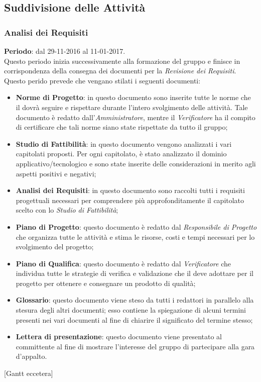 \subsection{Suddivisione delle Attività}
	\subsubsection{Analisi dei Requisiti}
	\textbf{Periodo}: dal 29-11-2016 al 11-01-2017.
	\\ Questo periodo inizia successivamente alla formazione del gruppo e finisce in corrispondenza della consegna dei documenti per la \emph{Revisione dei Requisiti}.
	Questo perido prevede che vengano stilati i seguenti documenti:
	\begin{itemize}
		\item \textbf{Norme di Progetto}: in questo documento sono inserite tutte le norme che il  dovrà seguire e rispettare durante l'intero svolgimento delle attività. Tale documento è redatto dall'\emph{Amministratore}, mentre il \emph{Verificatore} ha il compito di certificare che tali norme siano state rispettate da tutto il gruppo;
		\item \textbf{Studio di Fattibilità}: in questo documento vengono analizzati i vari capitolati proposti. Per ogni capitolato, è stato analizzato il dominio applicativo/tecnologico e sono state inserite delle considerazioni in merito agli aspetti positivi e negativi;
		\item \textbf{Analisi dei Requisiti}: in questo documento sono raccolti tutti i requisiti progettuali necessari per comprendere più approfonditamente	il capitolato scelto con lo \emph{Studio di Fattibilità};
		\item \textbf{Piano di Progetto}: questo documento è redatto dal \emph{Responsibile di Progetto} che organizza tutte le attività e stima le risorse, costi e tempi necessari per lo svolgimento del progetto;
		\item \textbf{Piano di Qualifica}: questo documento è redatto dal \emph{Verificatore} che individua tutte le strategie di verifica e validazione che il  deve adottare per il progetto per ottenere e consegnare un prodotto di qualità;
		\item \textbf{Glossario}: questo documento viene steso da tutti i redattori in parallelo alla stesura degli altri documenti; esso contiene la spiegazione di alcuni termini presenti nei vari documenti al fine di chiarire il significato del termine stesso;
		\item \textbf{Lettera di presentazione}: questo documento viene presentato al committente al fine di mostrare l'interesse del gruppo di partecipare alla gara d'appalto.
	\end{itemize}
	[Gantt eccetera]
